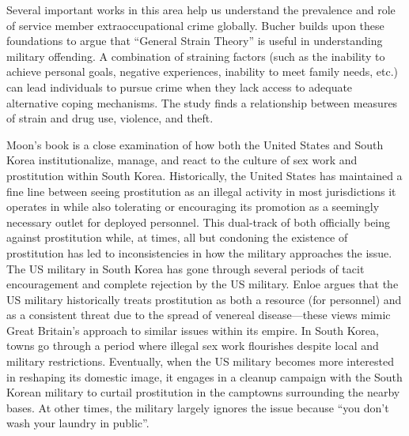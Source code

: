Several important works in this area help us understand the prevalence and role of service member extraoccupational crime globally. Bucher builds upon these foundations to argue that ``General Strain Theory'' is useful in understanding military offending.\cite{bucher2011} A combination of straining factors (such as the inability to achieve personal goals, negative experiences, inability to meet family needs, etc.) can lead individuals to pursue crime when they lack access to adequate alternative coping mechanisms. The study finds a relationship between measures of strain and drug use, violence, and theft.

Moon's book is a close examination of how both the United States and South Korea institutionalize, manage, and react to the culture of sex work and prostitution within South Korea.\cite{Moon1997} Historically, the United States has maintained a fine line between seeing prostitution as an illegal activity in most jurisdictions it operates in while also tolerating or encouraging its promotion as a seemingly necessary outlet for deployed personnel. This dual-track of both officially being against prostitution while, at times, all but condoning the existence of prostitution has led to inconsistencies in how the military approaches the issue. The US military in South Korea has gone through several periods of tacit encouragement and complete rejection by the US military.\cite{Baker2004} Enloe argues that the US military historically treats prostitution as both a resource (for personnel) and as a consistent threat due to the spread of venereal disease---these views mimic Great Britain's approach to similar issues within its empire.\cite{Enloe2000,Gillem2007} In South Korea, towns go through a period where illegal sex work flourishes despite local and military restrictions. Eventually, when the US military becomes more interested in reshaping its domestic image, it engages in a cleanup campaign with the South Korean military to curtail prostitution in the camptowns surrounding the nearby bases. At other times, the military largely ignores the issue because ``you don't wash your laundry in public''\cite{amb20180713}.

